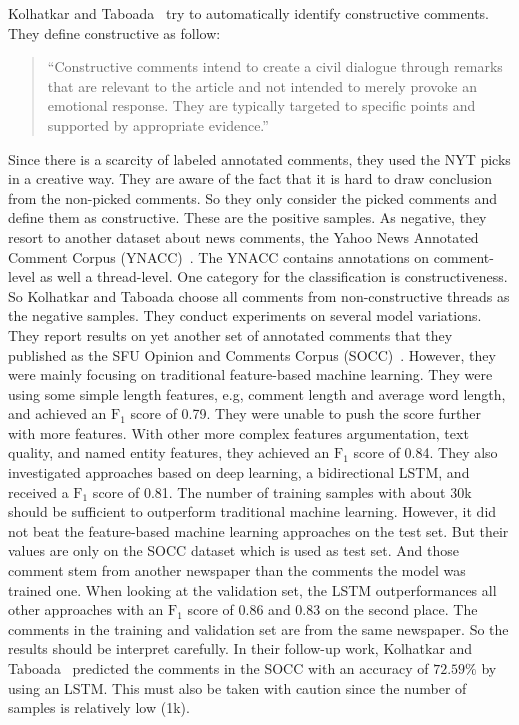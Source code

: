 Kolhatkar and Taboada~\cite{kolhatkar_using_2017} try to automatically identify constructive comments. They define constructive as follow:
\begin{quote}
     ``Constructive comments intend to create a civil dialogue through remarks that are relevant to the article and not intended to merely provoke an emotional response. They are typically targeted to specific points and supported by appropriate evidence.''
\end{quote}
Since there is a scarcity of labeled annotated comments, they used the NYT picks in a creative way. They are aware of the fact that it is hard to draw conclusion from the non-picked comments. So they only consider the picked comments and define them as constructive. These are the positive samples. As negative, they resort to another dataset about news comments, the Yahoo News Annotated Comment Corpus (YNACC)~\cite{napoles2017finding}. The YNACC contains annotations on comment-level as well a thread-level. One category for the classification is constructiveness. So Kolhatkar and Taboada choose all comments from non-constructive threads as the negative samples.
They conduct experiments on several model variations. They report results on yet another set of annotated comments that they published as the SFU Opinion and Comments Corpus (SOCC)~\cite{kolhatkar2018sfu}.
However, they were mainly focusing on traditional feature-based machine learning. They were using some simple length features, e.g, comment length and average word length, and achieved an $\text{F}_{1}$ score of 0.79. They were unable to push the score further with more features. With other more complex features argumentation, text quality, and named entity features, they achieved an $\text{F}_{1}$ score of 0.84. They also investigated approaches based on deep learning, a bidirectional LSTM, and received a $\text{F}_{1}$ score of 0.81. The number of training samples with about 30k should be sufficient to outperform traditional machine learning. However, it did not beat the feature-based machine learning approaches on the test set. But their values are only on the SOCC dataset which is used as test set. And those comment stem from another newspaper than the comments the model was trained one. When looking at the validation set, the LSTM outperformances all other approaches with an $\text{F}_{1}$ score of 0.86 and 0.83 on the second place. The comments in the training and validation set are from the same newspaper.
So the results should be interpret carefully. In their follow-up work, Kolhatkar and Taboada~\cite{kolhatkar2017constructive} predicted the comments in the SOCC with an accuracy of $72.59\%$ by using an LSTM.
This must also be taken with caution since the number of samples is relatively low (1k).

